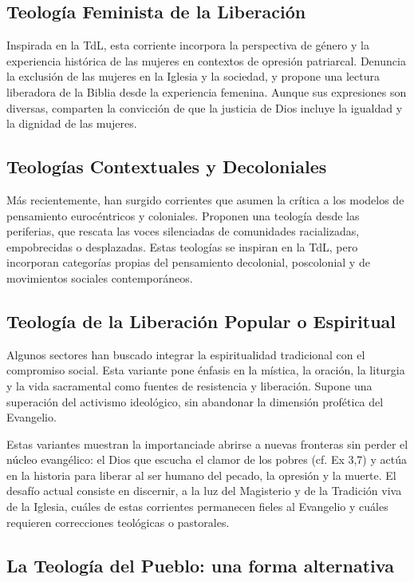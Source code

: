 \documentclass[12pt]{article}
\begin{document}
\subsection{Teología Feminista de la Liberación}
Inspirada en la TdL, esta corriente incorpora la perspectiva de género y la experiencia histórica de las mujeres en contextos de opresión patriarcal. Denuncia la exclusión de las mujeres en la Iglesia y la sociedad, y propone una lectura liberadora de la Biblia desde la experiencia femenina. Aunque sus expresiones son diversas, comparten la convicción de que la justicia de Dios incluye la igualdad y la dignidad de las mujeres.

\subsection{Teologías Contextuales y Decoloniales}
Más recientemente, han surgido corrientes que asumen la crítica a los modelos de pensamiento eurocéntricos y coloniales. Proponen una teología desde las periferias, que rescata las voces silenciadas de comunidades racializadas, empobrecidas o desplazadas. Estas teologías se inspiran en la TdL, pero incorporan categorías propias del pensamiento decolonial, poscolonial y de movimientos sociales contemporáneos.

\subsection{Teología de la Liberación Popular o Espiritual}
Algunos sectores han buscado integrar la espiritualidad tradicional con el compromiso social. Esta variante pone énfasis en la mística, la oración, la liturgia y la vida sacramental como fuentes de resistencia y liberación. Supone una superación del activismo ideológico, sin abandonar la dimensión profética del Evangelio.

Estas variantes muestran la importanciade abrirse a nuevas fronteras sin perder el núcleo evangélico: el Dios que escucha el clamor de los pobres (cf. Ex 3,7) y actúa en la historia para liberar al ser humano del pecado, la opresión y la muerte. El desafío actual consiste en discernir, a la luz del Magisterio y de la Tradición viva de la Iglesia, cuáles de estas corrientes permanecen fieles al Evangelio y cuáles requieren correcciones teológicas o pastorales.

\vspace{1cm}
\subsection{La Teología del Pueblo: una forma alternativa}
\end{document}
